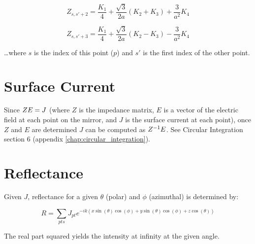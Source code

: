 \documentclass[etd,senior,noacknowledgments]{BYUPhys}
\begin{document}
\begin{equation}
  Z_{s,s'+2}=\frac{K_{1}}{4}+\frac{\sqrt{3}}{2a}\left(K_{2}+K_{3}\right)+\frac{3}{a^{2}}K_{4}
\end{equation}

\begin{equation}
  Z_{s,s'+3}=\frac{K_{1}}{4}+\frac{\sqrt{3}}{2a}\left(K_{2}-K_{3}\right)-\frac{3}{a^{2}}K_{4}
\end{equation}

\ldots where $s$ is the index of this point ($p$) and $s'$ is the first index of the other point.







\section{Surface Current} \label{sec:current}

Since $Z \space E = J$ (where $Z$ is the impedance matrix, $E$ is a vector of the electric field at each point on the mirror, and $J$ is the surface current at each point), once $Z$ and $E$ are determined $J$ can be computed as $Z^{-1} \space E$. See Circular Integration section 6 (appendix \ref{chap:circular_integration}).



\section{Reflectance} \label{sec:reflectance}

Given $J$, reflectance for a given $\theta$ (polar) and $\phi$ (azimuthal) is determined by:

\begin{equation}
  R=\sum_{pts}J_{pt}e^{-ik\left(x\sin\left(\theta\right)\cos\left(\phi\right)+y\sin\left(\theta\right)\cos\left(\phi\right)+z\cos\left(\theta\right)\right)}
\end{equation}

The real part squared yields the intensity at infinity at the given angle.

\end{document}
